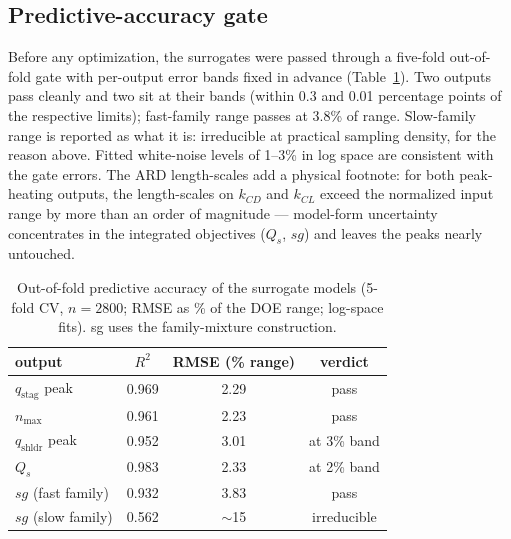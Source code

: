 \subsection{Predictive-accuracy gate}
\label{sec:gate}

Before any optimization, the surrogates were passed through a five-fold
out-of-fold gate with per-output error bands fixed in advance
(Table~\ref{tab:gate}). Two outputs pass cleanly and two sit at their bands
(within 0.3 and 0.01 percentage points of the respective limits); fast-family
range passes at 3.8\% of range. Slow-family range is reported as what it is:
irreducible at practical sampling density, for the reason above. Fitted
white-noise levels of 1--3\% in log space are consistent with the gate
errors. The ARD length-scales add a physical footnote: for both peak-heating
outputs, the length-scales on $k_{CD}$ and $k_{CL}$ exceed the normalized
input range by more than an order of magnitude --- model-form uncertainty
concentrates in the integrated objectives ($Q_s$, $sg$) and leaves the peaks
nearly untouched.

\begin{table}[htbp]
\centering
\caption{Out-of-fold predictive accuracy of the surrogate models
  (5-fold CV, $n=2800$; RMSE as \% of the DOE range; log-space fits).
  sg uses the family-mixture construction.}
\label{tab:gate}
\begin{tabular}{lccc}
\toprule
output & $R^2$ & RMSE (\% range) & verdict \\
\midrule
$q_{\mathrm{stag}}$ peak & 0.969 & 2.29 & pass \\
$n_{\max}$              & 0.961 & 2.23 & pass \\
$q_{\mathrm{shldr}}$ peak & 0.952 & 3.01 & at 3\% band \\
$Q_s$                   & 0.983 & 2.33 & at 2\% band \\
$sg$ (fast family)      & 0.932 & 3.83 & pass \\
$sg$ (slow family)      & 0.562 & $\sim$15 & irreducible \\
\bottomrule
\end{tabular}
\end{table}

